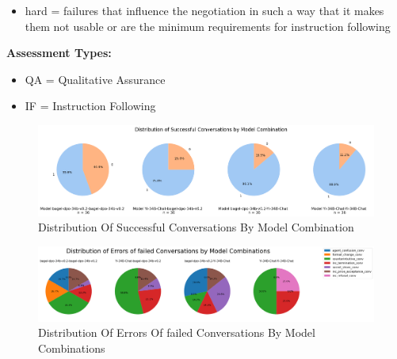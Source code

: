 \documentclass[runningheads]{llncs}
\begin{document}
\begin{table}
\begin{threeparttable}
\begin{tablenotes}
\begin{itemize}
        \item[\textbullet] hard = failures that influence the negotiation in such a way that it makes them not usable or are the minimum requirements for instruction following
    \end{itemize}
    \item \textbf{Assessment Types:} 
    \begin{itemize}
        \item[\textbullet] QA = Qualitative Assurance
        \item[\textbullet] IF = Instruction Following
    \end{itemize}
\end{tablenotes}

\end{threeparttable}
\end{table}

\begin{figure}[h]
    \includegraphics[width=1\textwidth]{plots/pieplot_successful_conversations.png}
    \caption[eval]{Distribution Of Successful Conversations By Model Combination}
    \label{fig:success_conversations}
\end{figure}


\begin{figure}[h]
    \includegraphics[width=1\textwidth]{plots/pieplot_failed_conversations_errors.png}
    \caption[eval]{Distribution Of Errors Of failed Conversations By Model Combinations}
    \label{fig:failed_conv_errors}
\end{figure}
\end{document}
